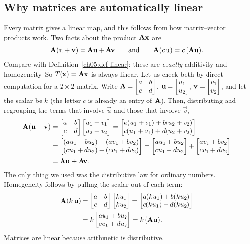 \subsection{Why matrices are automatically linear}

Every matrix gives a linear map, and this follows from
how matrix--vector products work. Two facts about the product $\mathbf{A}\mathbf{x}$ are
\[
  \mathbf{A}(\mathbf{u} + \mathbf{v}) = \mathbf{A}\mathbf{u} + \mathbf{A}\mathbf{v}
  \qquad\text{and}\qquad
  \mathbf{A}(c\,\mathbf{u}) = c\,(\mathbf{A}\mathbf{u}).
\]
Compare with Definition~\ref{ch05:def-linear}: these are \emph{exactly}
additivity and homogeneity. So $T(\mathbf{x}) = \mathbf{A}\mathbf{x}$ is always linear.
Let us check both by direct computation for a $2\times 2$ matrix. Write
$\mathbf{A} = \begin{bmatrix} a & b \\ c & d \end{bmatrix}$,
$\mathbf{u} = \begin{bmatrix}u_1\\u_2\end{bmatrix}$, $\mathbf{v} = \begin{bmatrix}v_1\\v_2\end{bmatrix}$, and let the scalar be
$k$ (the letter $c$ is already an entry of $\mathbf{A}$). Then, distributing and
regrouping the terms that involve $\vec{u}$ and those that involve $\vec{v}$,
\begin{align*}
  \mathbf{A}(\mathbf{u}+\mathbf{v})
  &= \begin{bmatrix} a & b \\ c & d \end{bmatrix}\begin{bmatrix}u_1+v_1\\u_2+v_2\end{bmatrix}
   = \begin{bmatrix}a(u_1+v_1) + b(u_2+v_2) \\ c(u_1+v_1) + d(u_2+v_2)\end{bmatrix} \\
  &= \begin{bmatrix}(au_1 + bu_2) + (av_1 + bv_2) \\ (cu_1+du_2) + (cv_1+dv_2)\end{bmatrix}
   = \begin{bmatrix}au_1+bu_2\\cu_1+du_2\end{bmatrix} + \begin{bmatrix}av_1+bv_2\\cv_1+dv_2\end{bmatrix} \\
  &= \mathbf{A}\mathbf{u} + \mathbf{A}\mathbf{v}.
\end{align*}
The only thing we used was the distributive law for ordinary numbers. Homogeneity
follows by pulling the scalar out of each term:
\begin{align*}
  \mathbf{A}(k\,\mathbf{u})
  &= \begin{bmatrix} a & b \\ c & d \end{bmatrix}\begin{bmatrix}k u_1 \\ k u_2\end{bmatrix}
   = \begin{bmatrix}a(k u_1) + b(k u_2) \\ c(k u_1) + d(k u_2)\end{bmatrix} \\
  &= k\begin{bmatrix}au_1+bu_2\\cu_1+du_2\end{bmatrix}
   = k\,(\mathbf{A}\mathbf{u}).
\end{align*}
Matrices are linear because arithmetic is distributive.

